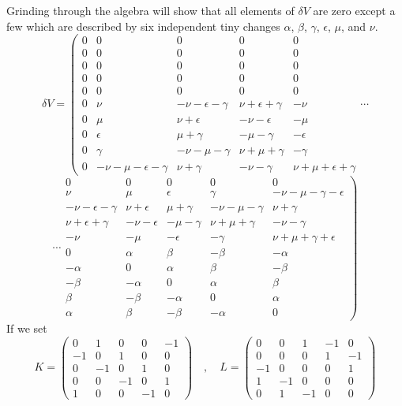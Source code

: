 \documentclass[12pt]{article}
\begin{document}
 Grinding through the algebra will show that all
elements of $\delta V$ are zero except a few which are described by
six independent tiny changes $\alpha$, $\beta$, $\gamma$, $\epsilon$,
$\mu$, and $\nu$.
\begin{displaymath}
\delta V = \left(
\begin{array}{ccccc}
0 & 0 & 0 & 0 & 0 \\
0 & 0 & 0 & 0 & 0 \\
0 & 0 & 0 & 0 & 0 \\
0 & 0 & 0 & 0 & 0 \\
0 & 0 & 0 & 0 & 0 \\
0 & \nu & -\nu-\epsilon-\gamma & \nu+\epsilon+\gamma & -\nu \\
0 & \mu & \nu+\epsilon & -\nu-\epsilon & -\mu \\
0 & \epsilon & \mu+\gamma & -\mu-\gamma & -\epsilon \\
0 & \gamma & -\nu-\mu-\gamma & \nu+\mu+\gamma & -\gamma \\
0 & -\nu-\mu-\epsilon-\gamma & \nu+\gamma & -\nu-\gamma & 
\nu+\mu+\epsilon+\gamma 
\end{array} \cdots \right.
\end{displaymath}
\begin{displaymath}
\left. \cdots \begin{array}{ccccc}
0 & 0 & 0 & 0 & 0 \\
\nu & \mu & \epsilon & \gamma & -\nu-\mu-\gamma-\epsilon \\
-\nu-\epsilon-\gamma & \nu+\epsilon & \mu+\gamma & -\nu-\mu-\gamma & \nu+\gamma \\
\nu+\epsilon+\gamma & -\nu-\epsilon & -\mu-\gamma & \nu+\mu+\gamma & -\nu-\gamma \\
-\nu & -\mu & -\epsilon & -\gamma & \nu+\mu+\gamma+\epsilon \\
0 & \alpha & \beta & -\beta & -\alpha \\
-\alpha & 0 & \alpha & \beta & -\beta \\
-\beta & -\alpha & 0 & \alpha & \beta \\
\beta & -\beta & -\alpha & 0 & \alpha \\
\alpha & \beta & -\beta & -\alpha & 0 
\end{array} \right)
\end{displaymath}
If we set
\begin{displaymath}
K = \left(
\begin{array}{ccccc}
0 & 1 & 0 & 0 & -1 \\
-1 & 0 & 1 & 0 & 0 \\
0 & -1 & 0 & 1 & 0 \\
0 & 0 & -1 & 0 & 1 \\
1 & 0 & 0 & -1 & 0
\end{array} \right)
\quad , \quad
L = \left(
\begin{array}{ccccc}
0 & 0 & 1 & -1 & 0 \\
0 & 0 & 0 & 1 & -1 \\
-1 & 0 & 0 & 0 & 1 \\
1 & -1 & 0 & 0 & 0 \\
0 & 1 & -1 & 0 & 0
\end{array} \right)
\end{displaymath}
\end{document}
